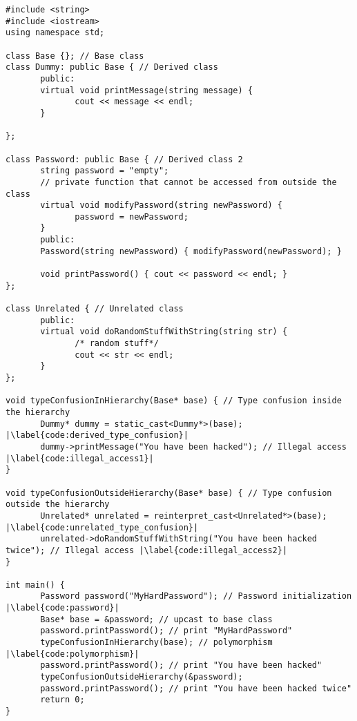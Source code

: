 \documentclass[a4paper,11pt,oneside]{report}
\begin{document}
\begin{listing}
       \begin{verbatim}
#include <string>
#include <iostream>
using namespace std;

class Base {}; // Base class
class Dummy: public Base { // Derived class
       public:
       virtual void printMessage(string message) {
              cout << message << endl;
       }
       
};

class Password: public Base { // Derived class 2
       string password = "empty";
       // private function that cannot be accessed from outside the class
       virtual void modifyPassword(string newPassword) {
              password = newPassword;
       }
       public:
       Password(string newPassword) { modifyPassword(newPassword); }

       void printPassword() { cout << password << endl; }
};

class Unrelated { // Unrelated class
       public: 
       virtual void doRandomStuffWithString(string str) {
              /* random stuff*/
              cout << str << endl;
       }
};

void typeConfusionInHierarchy(Base* base) { // Type confusion inside the hierarchy
       Dummy* dummy = static_cast<Dummy*>(base); |\label{code:derived_type_confusion}|
       dummy->printMessage("You have been hacked"); // Illegal access |\label{code:illegal_access1}|
}

void typeConfusionOutsideHierarchy(Base* base) { // Type confusion outside the hierarchy
       Unrelated* unrelated = reinterpret_cast<Unrelated*>(base); |\label{code:unrelated_type_confusion}|
       unrelated->doRandomStuffWithString("You have been hacked twice"); // Illegal access |\label{code:illegal_access2}|
}

int main() {
       Password password("MyHardPassword"); // Password initialization |\label{code:password}|
       Base* base = &password; // upcast to base class
       password.printPassword(); // print "MyHardPassword"
       typeConfusionInHierarchy(base); // polymorphism |\label{code:polymorphism}|
       password.printPassword(); // print "You have been hacked"
       typeConfusionOutsideHierarchy(&password);
       password.printPassword(); // print "You have been hacked twice"
       return 0;
}
       \end{verbatim}
       \caption{Example of type confusion in C++ within the same class hierarchy}
       \label{lst:type_confusion}
\end{listing}
\end{document}
